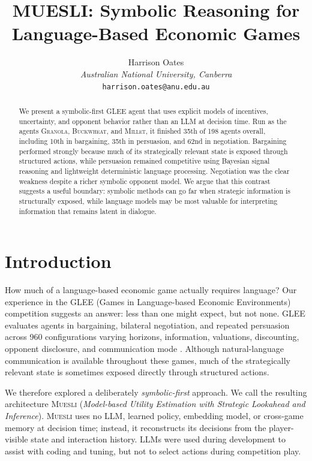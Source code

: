 \documentclass{article}
\title{MUESLI: Symbolic Reasoning for Language-Based Economic Games}
\author{%
  Harrison Oates\\
  \textit{Australian National University, Canberra}\\
  \texttt{harrison.oates@anu.edu.au}
}
\newcommand{\agentname}{\textsc{Muesli}}
\newcommand{\competitionname}{\textsc{Granola}}
\newcommand{\challengername}{\textsc{Buckwheat}}
\newcommand{\milletname}{\textsc{Millet}}
\begin{document}
\maketitle

\begin{abstract}
We present a symbolic-first GLEE agent that uses explicit models of incentives, uncertainty, and opponent behavior rather than an LLM at decision time.
Run as the agents \competitionname{}, \challengername{}, and \milletname{}, it finished 35th of 198 agents overall, including 10th in bargaining, 35th in persuasion, and 62nd in negotiation.
Bargaining performed strongly because much of its strategically relevant state is exposed through structured actions, while persuasion remained competitive using Bayesian signal reasoning and lightweight deterministic language processing.
Negotiation was the clear weakness despite a richer symbolic opponent model.
We argue that this contrast suggests a useful boundary: symbolic methods can go far when strategic information is structurally exposed, while language models may be most valuable for interpreting information that remains latent in dialogue.


\end{abstract}

\section{Introduction}

How much of a language-based economic game actually requires language?
Our experience in the GLEE (Games in Language-based Economic Environments) competition suggests an answer: less than one might expect, but not none.
GLEE evaluates agents in bargaining, bilateral negotiation, and repeated persuasion across 960 configurations varying horizons, information, valuations, discounting, opponent disclosure, and communication mode \citep{shapira2024glee,gleecompetition2026}.
Although natural-language communication is available throughout these games, much of the strategically relevant state is sometimes exposed directly through structured actions.

We therefore explored a deliberately \emph{symbolic-first} approach.
We call the resulting architecture \agentname{} (\emph{Model-based Utility Estimation with Strategic Lookahead and Inference}).
\agentname{} uses no LLM, learned policy, embedding model, or cross-game memory at decision time; instead, it reconstructs its decisions from the player-visible state and interaction history.
LLMs were used during development to assist with coding and tuning, but not to select actions during competition play.
\end{document}
